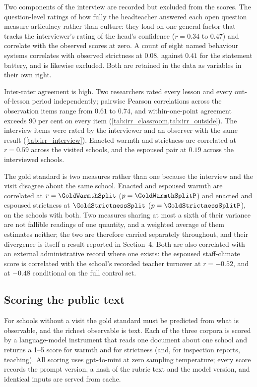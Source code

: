 Two components of the interview are recorded but excluded from the scores. The
question-level ratings of how fully the headteacher answered each open
question measure articulacy rather than culture: they load on one general
factor that tracks the interviewer's rating of the head's confidence
($r = 0.34$ to $0.47$) and correlate with the observed scores at zero. A count
of eight named behaviour systems correlates with observed strictness at
$0.08$, against $0.41$ for the statement battery, and is likewise excluded.
Both are retained in the data as variables in their own right.

Inter-rater agreement is high. Two researchers rated every lesson and every
out-of-lesson period independently; pairwise Pearson correlations across the
observation items range from $0.61$ to $0.74$, and within-one-point agreement
exceeds 90 per cent on every item (\cref{tab:irr_classroom,tab:irr_outside}).
The interview items were rated by the interviewer and an observer with the
same result (\cref{tab:irr_interview}). Enacted warmth and strictness are
correlated at $r = 0.59$ across the \NTierOne{} visited schools, and the
espoused pair at $0.19$ across the interviewed schools.

The gold standard is two measures rather than one because the interview and
the visit disagree about the same school. Enacted and espoused warmth are
correlated at $r = \GoldWarmthSplit$ ($p = \GoldWarmthSplitP$) and enacted and
espoused strictness at $\GoldStrictnessSplit$ ($p = \GoldStrictnessSplitP$),
on the \NTierOne{} schools with both. Two measures sharing at most a sixth of
their variance are not fallible readings of one quantity, and a weighted
average of them estimates neither; the two are therefore carried separately
throughout, and their divergence is itself a result reported in Section~4.
Both are also correlated with an external administrative record where one
exists: the espoused staff-climate score is correlated with the school's
recorded teacher turnover at $r = -0.52$, and at $-0.48$ conditional on the
full control set.

\subsection{Scoring the public text}

For schools without a visit the gold standard must be predicted from what is
observable, and the richest observable is text. Each of the three corpora is
scored by a language-model instrument that reads one document about one
school and returns a 1--5 score for warmth and for strictness (and, for
inspection reports, teaching). All scoring uses gpt-4o-mini at zero
sampling temperature; every score records the prompt version, a hash of the
rubric text and the model version, and identical inputs are served from
cache.


